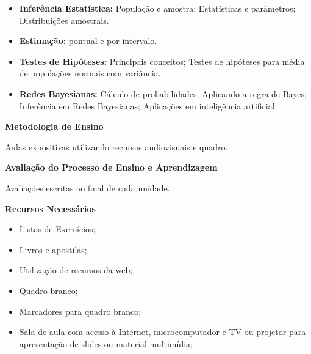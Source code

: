 \begin{itemize}
 \item \textbf{Inferência Estatística:} População e amostra; Estatísticas e parâmetros; Distribuições amostrais.
 
 \item \textbf{Estimação:} pontual e por intervalo.
 
 \item \textbf{Testes de Hipóteses:} Principais conceitos; Testes de hipóteses para média de populações normais com variância.
 
 \item \textbf{Redes Bayesianas:} Cálculo de probabilidades; Aplicando a regra de Bayes; Inferência em Redes Bayesianas; Aplicações em inteligência artificial.
 
 \end{itemize}

\begin{snugshade}\begin{center}\textbf{
    Metodologia de Ensino
}\end{center}\end{snugshade}

\noindent
  Aulas expositivas utilizando recursos audiovisuais e quadro.

\begin{snugshade}\begin{center}\textbf{
    Avaliação do Processo de Ensino e Aprendizagem
}\end{center}\end{snugshade}

\noindent
   Avaliações escritas ao final de cada unidade.
   
\begin{snugshade}\begin{center}\textbf{
    Recursos Necessários
    \vphantom{q} %
}\end{center}\end{snugshade}

\begin{itemize} 
   \item Listas de Exercícios;
   \item Livros e apostilas;
   \item Utilização de recursos da web;
   \item Quadro branco;
   \item Marcadores para quadro branco;
   \item Sala de aula com acesso à Internet, microcomputador e TV ou projetor para apresentação de slides ou material multimídia;
\end{itemize}

